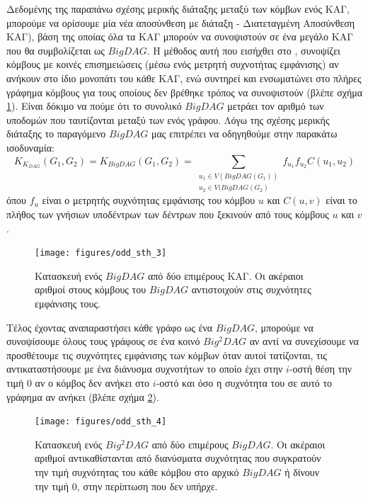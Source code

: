 Δεδομένης της παραπάνω σχέσης μερικής διάταξης μεταξύ των κόμβων ενός ΚΑΓ, μπορούμε να ορίσουμε μία νέα αποσύνθεση με διάταξη  - Διατεταγμένη Αποσύνθεση ΚΑΓ), βάση της οποίας όλα τα ΚΑΓ μπορούν να συνοψιστούν σε ένα μεγάλο ΚΑΓ που θα συμβολίζεται ως $BigDAG$.
Η μέθοδος αυτή που εισήχθει στο \cite[MinimalDAG:  2, p. 3]{Martino2006}, συνοψίζει κόμβους με κοινές επισημειώσεις (μέσω ενός μετρητή συχνοτήτας εμφάνισης) αν ανήκουν στο ίδιο μονοπάτι του κάθε ΚΑΓ, ενώ συντηρεί και ενσωματώνει στο πλήρες γράφημα κόμβους για τους οποίους δεν βρέθηκε τρόπος να συνοψιστούν  (βλέπε σχήμα \ref{fig:odd_sth_3}).
Είναι δόκιμο να πούμε ότι το συνολικό $BigDAG$ μετράει τον αριθμό των υποδομών που ταυτίζονται μεταξύ των  ενός γράφου.
Λόγω της σχέσης μερικής διάταξης το παραγόμενο $BigDAG$ μας επιτρέπει να οδηγηθούμε στην παρακάτω ισοδυναμία:
\begin{equation}
K_{K_{DAG}}(G_{1}, G_{2}) = K_{BigDAG}(G_{1}, G_{2}) = \sum_{\substack{u_{1} \in V(BigDAG(G_{1}))\\ u_{2} \in V(BigDAG(G_{2})}} f_{u_{1}}f_{u_{2}}C(u_{1}, u_{2})
\end{equation}
όπου $f_{u}$ είναι ο μετρητής συχνότητας εμφάνισης του κόμβου $u$ και $C(u, v)$ είναι το πλήθος των γνήσιων υποδέντρων των δέντρων που ξεκινούν από τους κόμβους $u$ και $v$.
\begin{figure}[]
\centering
\texttt{[image: figures/odd\_sth\_3]}
\caption[Κατασκευή ενός $BigDAG$ από δύο επιμέρους ΚΑΓ.]{Κατασκευή ενός $BigDAG$ από δύο επιμέρους ΚΑΓ. Οι ακέραιοι αριθμοί στους κόμβους του $BigDAG$ αντιστοιχούν στις συχνότητες εμφάνισης τους.}
\label{fig:odd_sth_3}
\end{figure}

Τέλος έχοντας αναπαραστήσει κάθε γράφο ως ένα $BigDAG$, μπορούμε να συνοψίσουμε όλους τους γράφους σε ένα κοινό $Big^{2}DAG$ αν αντί να συνεχίσουμε να προσθέτουμε τις συχνότητες εμφάνισης των κόμβων όταν αυτοί τατίζονται, τις αντικαταστήσουμε με ένα διάνυσμα συχνοτήτων το οποίο έχει στην $i$-οστή θέση την τιμή $0$ αν ο κόμβος δεν ανήκει στο $i$-οστό και όσο η συχνότητα του σε αυτό το γράφημα αν ανήκει (βλέπε σχήμα \ref{fig:odd_sth_4}).
\begin{figure}[]
\centering
\texttt{[image: figures/odd\_sth\_4]}
\caption[Κατασκευή ενός $Big^{2}DAG$ από δύο επιμέρους $BigDAG$.]{Κατασκευή ενός $Big^{2}DAG$ από δύο επιμέρους $BigDAG$. Οι ακέραιοι αριθμοί αντικαθίστανται από διανύσματα συχνότητας που συγκρατούν την τιμή συχνότητας του κάθε κόμβου στο αρχικό $BigDAG$ ή δίνουν την τιμή $0$, στην περίπτωση που δεν υπήρχε.}
\label{fig:odd_sth_4}
\end{figure}


